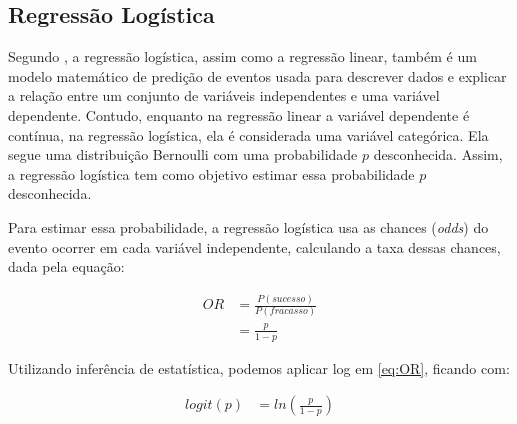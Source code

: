 \subsection{Regressão Logística}

Segundo , a regressão logística, assim como a regressão linear, também é um modelo matemático de predição de eventos usada para descrever dados e explicar a relação entre um conjunto de variáveis independentes e uma variável dependente. Contudo, enquanto na regressão linear a variável dependente é contínua, na regressão logística, ela é considerada uma variável categórica. Ela segue uma distribuição Bernoulli\footnotemark {} com uma probabilidade \begin{math}p\end{math} desconhecida. Assim, a regressão logística tem como objetivo estimar essa probabilidade \begin{math}p\end{math} desconhecida.

Para estimar essa probabilidade, a regressão logística usa as chances (\emph{odds}) do evento ocorrer em cada variável independente, calculando a taxa dessas chances, dada pela equação:

\begin{equation}
  \label{eq:OR}
  \begin{aligned}
   OR &= \frac{P(sucesso)}{P(fracasso)}\\
     &= \frac{p}{1-p}
  \end{aligned}
\end{equation}

Utilizando inferência de estatística, podemos aplicar log em \ref{eq:OR}, ficando com:

\begin{equation}
  \label{eq:t}
  \begin{aligned}
    logit(p) &= ln\left ( \frac{p}{1-p} \right )
  \end{aligned}
\end{equation}

